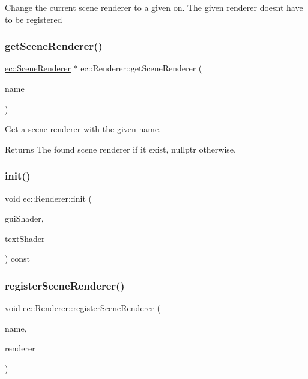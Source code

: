 Change the current scene renderer to a given on. The given renderer doesn\textquotesingle{}t have to be registered \mbox{\label{classec_1_1_renderer_ab4e0c57f9d1f061f97e1fa188d52c477}} 
\subsubsection{\texorpdfstring{get\+Scene\+Renderer()}{getSceneRenderer()}}
{\footnotesize\ttfamily \mbox{\hyperlink{classec_1_1_scene_renderer}{ec\+::\+Scene\+Renderer}} $\ast$ ec\+::\+Renderer\+::get\+Scene\+Renderer (\begin{DoxyParamCaption}\item[{const std\+::string \&}]{name }\end{DoxyParamCaption})}

Get a scene renderer with the given name. \begin{DoxyReturn}{Returns}
The found scene renderer if it exist, nullptr otherwise. 
\end{DoxyReturn}
\mbox{\label{classec_1_1_renderer_acfa2ed0fd23f3f6e36de59302a0148ad}} 
\subsubsection{\texorpdfstring{init()}{init()}}
{\footnotesize\ttfamily void ec\+::\+Renderer\+::init (\begin{DoxyParamCaption}\item[{\mbox{\hyperlink{classec_1_1_shader}{Shader}} $\ast$}]{gui\+Shader,  }\item[{\mbox{\hyperlink{classec_1_1_shader}{Shader}} $\ast$}]{text\+Shader }\end{DoxyParamCaption}) const}

\mbox{\label{classec_1_1_renderer_a5e40791070a8fcb7250b4544bdac8725}} 
\subsubsection{\texorpdfstring{register\+Scene\+Renderer()}{registerSceneRenderer()}}
{\footnotesize\ttfamily void ec\+::\+Renderer\+::register\+Scene\+Renderer (\begin{DoxyParamCaption}\item[{const std\+::string \&}]{name,  }\item[{\mbox{\hyperlink{classec_1_1_scene_renderer}{Scene\+Renderer}} $\ast$}]{renderer }\end{DoxyParamCaption})}

